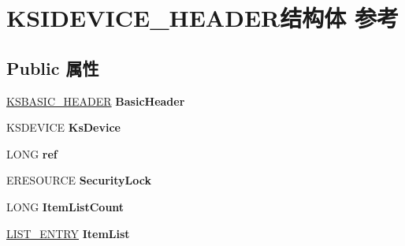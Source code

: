 \hypertarget{struct_k_s_i_d_e_v_i_c_e___h_e_a_d_e_r}{}\section{K\+S\+I\+D\+E\+V\+I\+C\+E\+\_\+\+H\+E\+A\+D\+E\+R结构体 参考}
\label{struct_k_s_i_d_e_v_i_c_e___h_e_a_d_e_r}
\subsection*{Public 属性}
\begin{DoxyCompactItemize}
\item 
\mbox{\label{struct_k_s_i_d_e_v_i_c_e___h_e_a_d_e_r_a0459ffd1525b2b095922947a5ef16723}} 
\hyperlink{struct_k_s_b_a_s_i_c___h_e_a_d_e_r}{K\+S\+B\+A\+S\+I\+C\+\_\+\+H\+E\+A\+D\+ER} {\bfseries Basic\+Header}
\item 
\mbox{\label{struct_k_s_i_d_e_v_i_c_e___h_e_a_d_e_r_a2de3f77c0c1d5651a05509b38a4ca91a}} 
K\+S\+D\+E\+V\+I\+CE {\bfseries Ks\+Device}
\item 
\mbox{\label{struct_k_s_i_d_e_v_i_c_e___h_e_a_d_e_r_a6aa71a09d8fded306e6063955d0187d4}} 
L\+O\+NG {\bfseries ref}
\item 
\mbox{\label{struct_k_s_i_d_e_v_i_c_e___h_e_a_d_e_r_a8d6a981a6a9d6294228241fb2404219b}} 
E\+R\+E\+S\+O\+U\+R\+CE {\bfseries Security\+Lock}
\item 
\mbox{\label{struct_k_s_i_d_e_v_i_c_e___h_e_a_d_e_r_a00de1101b1487e4f073be863237d0d54}} 
L\+O\+NG {\bfseries Item\+List\+Count}
\item 
\mbox{\label{struct_k_s_i_d_e_v_i_c_e___h_e_a_d_e_r_a9033cf7d6336bcd7e67623947583f80b}} 
\hyperlink{struct___l_i_s_t___e_n_t_r_y}{L\+I\+S\+T\+\_\+\+E\+N\+T\+RY} {\bfseries Item\+List}
\item 
\mbox{\label{struct_k_s_i_d_e_v_i_c_e___h_e_a_d_e_r_a8d2fb6e23225d592f98e4369e5885402}} 

\end{DoxyCompactItemize}
